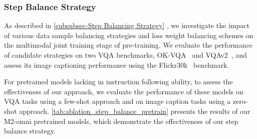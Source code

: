 \subsubsection{Step Balance Strategy}\label{subsubsec:step_balance_ablaton}

As described in \cref{subsubsec-Step Balancing Strategy} ,  we investigate the impact of various data sample balancing strategies and loss weight balancing schemes on the multimodal joint training stage of pre-training. We evaluate the performance of candidate strategies on two VQA benchmarks, OK-VQA~\cite{marino2019ok} and VQAv2~\cite{goyal2017making}, and assess its image captioning performance using the Flickr30k~\cite{young2014image} benchmark.

For pretrained models lacking in instruction following ability, to assess the effectiveness of our approach, we evaluate the performance of these models on VQA tasks using a few-shot approach and on image caption tasks using a zero-shot approach. \cref{tab:ablation_step_balance_pretrain} presents the results of our M2-omni pretrained models, which demonstrate the effectiveness of our step balance strategy.









